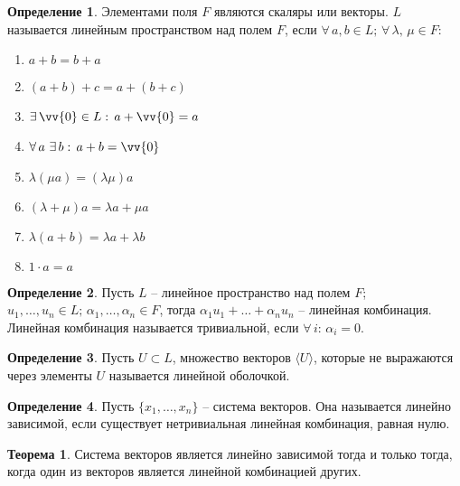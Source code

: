 \documentclass[12pt]{article}
\theoremstyle{definition}
\newtheorem{theorem}{Теорема}[section]
\newtheorem{definition}{Определение}
\begin{document}
\begin{definition}
    Элементами поля $F$ являются скаляры или векторы. $L$ называется линейным пространством над полем $F$, если $\forall\,a,b\in L;\,\forall\,\lambda,\,\mu \in F$:
    \begin{center}
        \begin{multicols}{2}
            \begin{enumerate}
                \item $a+b=b+a$\\
                \item $(a+b)+c=a+(b+c)$\\
                \item $\exists\,\vv{0}\in L:\,a+\vv{0}=a$\\
                \item $\forall\,a\,\, \exists\,b:\,a+b=\vv{0}$\\
                \item $\lambda(\mu a)=(\lambda \mu)a$\\
                \item $(\lambda+\mu)a=\lambda a + \mu a$\\
                \item $\lambda(a+b)=\lambda a+ \lambda b$\\
                \item $1\cdot a = a$
            \end{enumerate}
        \end{multicols}
    \end{center}
\end{definition}
\begin{definition}
    Пусть $L$ – линейное пространство над полем $F$; $u_1,\ldots,u_n\in L;\,\alpha_1,\ldots,\alpha_n\in F$, тогда $\alpha_1u_1+\ldots+\alpha_nu_n$ – линейная комбинация. Линейная комбинация называется тривиальной, если $\forall\,i:\,\alpha_i=0$.
\end{definition}
\begin{definition}
    Пусть $U\subset L$, множество векторов $\langle U\rangle$, которые не выражаются через элементы $U$ называется линейной оболочкой.
\end{definition}
\begin{definition}
    Пусть $\{x_1,\ldots,x_n\}$ – система векторов. Она называется линейно зависимой, если существует нетривиальная линейная комбинация, равная нулю.
\end{definition}
\begin{theorem}
    Система векторов является линейно зависимой тогда и только тогда, когда один из векторов является линейной комбинацией других.
\end{theorem}
\end{document}
